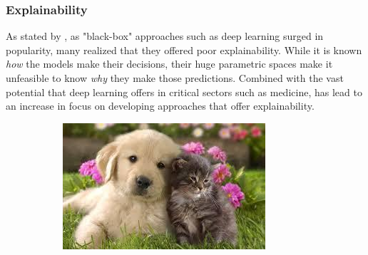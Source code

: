 \subsubsection{Explainability}
As stated by \textcite{XAI}, as "black-box" approaches such as deep learning surged in popularity, many realized that they offered poor explainability. While it is known \textit{how} the models make their decisions, their huge parametric spaces make it unfeasible to know \textit{why} they make those predictions. Combined with the vast potential that deep learning offers in critical sectors such as medicine, has lead to an increase in focus on developing approaches that offer explainability.
\begin{figure}[H]
    \centering
    \begin{subfigure}{0.3\linewidth}
        \includegraphics[width=\linewidth, height=\linewidth]{resources/related_works/gradcam_original.jpg}
    \end{subfigure}
    \hfill
    \begin{subfigure}{0.3\linewidth}

\end{subfigure}
\end{figure}
